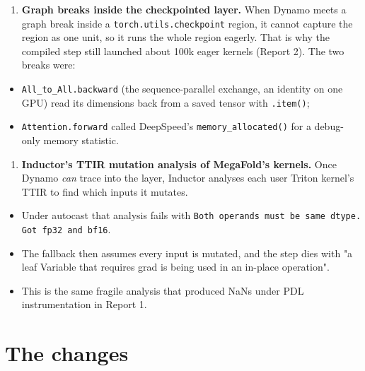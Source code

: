 \documentclass[10pt]{article}
\begin{document}
\begin{enumerate}
\item \textbf{Graph breaks inside the checkpointed layer.} When Dynamo meets a graph break inside a \texttt{torch.utils.checkpoint} region, it cannot capture the region as one unit, so it runs the whole region eagerly. That is why the compiled step still launched about 100k eager kernels (Report 2). The two breaks were:
\end{enumerate}
\begin{itemize}
\item \texttt{All\_to\_All.backward} (the sequence-parallel exchange, an identity on one GPU) read its dimensions back from a saved tensor with \texttt{.item()};
\item \texttt{Attention.forward} called DeepSpeed's \texttt{memory\_allocated()} for a debug-only memory statistic.
\end{itemize}
\begin{enumerate}
\item \textbf{Inductor's TTIR mutation analysis of MegaFold's kernels.} Once Dynamo \emph{can} trace into the layer, Inductor analyses each user Triton kernel's TTIR to find which inputs it mutates.
\end{enumerate}
\begin{itemize}
\item Under autocast that analysis fails with \texttt{Both operands must be same dtype. Got fp32 and bf16}.
\item The fallback then assumes every input is mutated, and the step dies with "a leaf Variable that requires grad is being used in an in-place operation".
\item This is the same fragile analysis that produced NaNs under PDL instrumentation in Report 1.
\end{itemize}

\section{The changes}
\end{document}
